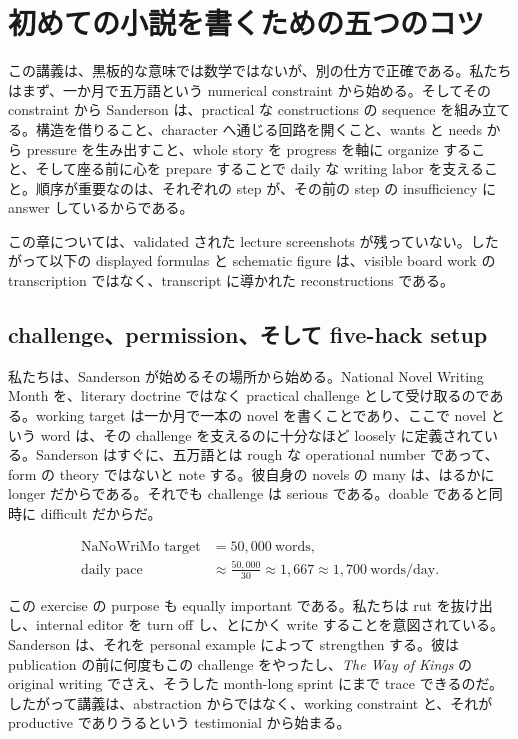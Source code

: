 \chapter{初めての小説を書くための五つのコツ}

この講義は、黒板的な意味では数学ではないが、別の仕方で正確である。私たちはまず、一か月で五万語という numerical constraint から始める。そしてその constraint から Sanderson は、practical な constructions の sequence を組み立てる。構造を借りること、character へ通じる回路を開くこと、wants と needs から pressure を生み出すこと、whole story を progress を軸に organize すること、そして座る前に心を prepare することで daily な writing labor を支えること。順序が重要なのは、それぞれの step が、その前の step の insufficiency に answer しているからである。

\begin{remark}
この章については、validated された lecture screenshots が残っていない。したがって以下の displayed formulas と schematic figure は、visible board work の transcription ではなく、transcript に導かれた reconstructions である。
\end{remark}

\section{challenge、permission、そして five-hack setup}

私たちは、Sanderson が始めるその場所から始める。National Novel Writing Month を、literary doctrine ではなく practical challenge として受け取るのである。working target は一か月で一本の novel を書くことであり、ここで novel という word は、その challenge を支えるのに十分なほど loosely に定義されている。Sanderson はすぐに、五万語とは rough な operational number であって、form の theory ではないと note する。彼自身の novels の many は、はるかに longer だからである。それでも challenge は serious である。doable であると同時に difficult だからだ。

\begin{align}
\text{NaNoWriMo target} &= 50{,}000\ \text{words},\\
\text{daily pace} &\approx \frac{50{,}000}{30} \approx 1{,}667 \approx 1{,}700\ \text{words/day}.
\end{align}

この exercise の purpose も equally important である。私たちは rut を抜け出し、internal editor を turn off し、とにかく write することを意図されている。Sanderson は、それを personal example によって strengthen する。彼は publication の前に何度もこの challenge をやったし、\textit{The Way of Kings} の original writing でさえ、そうした month-long sprint にまで trace できるのだ。したがって講義は、abstraction からではなく、working constraint と、それが productive でありうるという testimonial から始まる。

